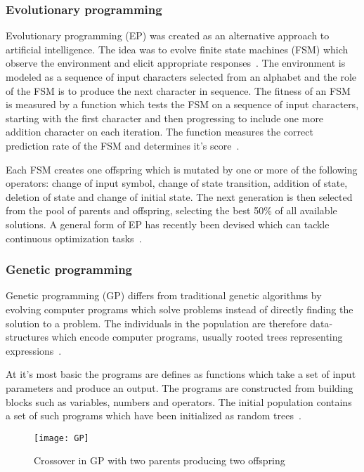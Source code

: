 \subsubsection{Evolutionary programming}

Evolutionary programming (EP) was created as an alternative approach to artificial intelligence. The idea was to evolve finite state machines (FSM) which observe the environment and elicit appropriate responses~\cite{Fogel1996}. The environment is modeled as a sequence of input characters selected from an alphabet and the role of the FSM is to produce the next character in sequence. The fitness of an FSM is measured by a function which tests the FSM on a sequence of input characters, starting with the first character and then progressing to include one more addition character on each iteration. The function measures the correct prediction rate of the FSM and determines it's score~\cite{Michalewicz1997}.

Each FSM creates one offspring which is mutated by one or more of the following operators: change of input symbol, change of state transition, addition of state, deletion of state and change of initial state. The next generation is then selected from the pool of parents and offspring, selecting the best 50\% of all available solutions. A general form of EP has recently been devised which can tackle continuous optimization tasks~\cite{Michalewicz1997}.

\subsubsection{Genetic programming}

Genetic programming (GP) differs from traditional genetic algorithms by evolving computer programs which solve problems instead of directly finding the solution to a problem. The individuals in the population are therefore data-structures which encode computer programs, usually rooted trees representing expressions~\cite{Michalewicz1997}.

At it's most basic the programs are defines as functions which take a set of input parameters and produce an output. The programs are constructed from building blocks such as variables, numbers and operators. The initial population contains a set of such programs which have been initialized as random trees~\cite{Michalewicz1997}.

\begin{figure}[H]
  \centering
  \texttt{[image: GP]}
  \caption{Crossover in GP with two parents producing two offspring}
  \label{fig:GP}
\end{figure}

